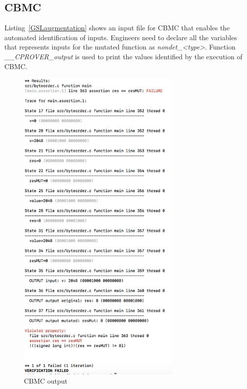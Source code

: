 \subsection{CBMC}



Listing~\ref{GSLaugmentation} shows an input file for CBMC that enables the automated identification of inputs. 
Engineers need to declare all the variables that represents inputs for the mutated function as \emph{nondet_<type>}. Function \emph{\_\_CPROVER\_output} is used to print the values identified by the execution of CBMC.

\begin{figure}[tb]
\begin{center}
\includegraphics[width=8cm]{images/CBMCoutput}
\caption{CBMC output}
\label{fig:cbmcOutput}
\end{center}
\end{figure}